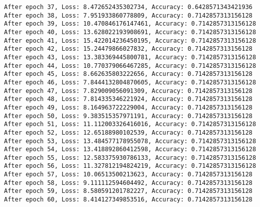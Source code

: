 \documentclass[11pt]{article}
\begin{document}
\begin{Verbatim}[commandchars=\\\{\}]
After epoch 37, Loss: 8.472652435302734, Accuracy: 0.6428571343421936
After epoch 38, Loss: 7.951933860778809, Accuracy: 0.7142857313156128
After epoch 39, Loss: 10.470846176147461, Accuracy: 0.7142857313156128
After epoch 40, Loss: 13.628022193908691, Accuracy: 0.7142857313156128
After epoch 41, Loss: 15.422014236450195, Accuracy: 0.7142857313156128
After epoch 42, Loss: 15.24479866027832, Accuracy: 0.7142857313156128
After epoch 43, Loss: 13.383369445800781, Accuracy: 0.7142857313156128
After epoch 44, Loss: 10.770379066467285, Accuracy: 0.7142857313156128
After epoch 45, Loss: 8.662635803222656, Accuracy: 0.7142857313156128
After epoch 46, Loss: 7.8444132804870605, Accuracy: 0.7142857313156128
After epoch 47, Loss: 7.829009056091309, Accuracy: 0.7142857313156128
After epoch 48, Loss: 7.814335346221924, Accuracy: 0.7142857313156128
After epoch 49, Loss: 8.164963722229004, Accuracy: 0.7142857313156128
After epoch 50, Loss: 9.383515357971191, Accuracy: 0.7142857313156128
After epoch 51, Loss: 11.112003326416016, Accuracy: 0.7142857313156128
After epoch 52, Loss: 12.65188980102539, Accuracy: 0.7142857313156128
After epoch 53, Loss: 13.484577178955078, Accuracy: 0.7142857313156128
After epoch 54, Loss: 13.418892860412598, Accuracy: 0.7142857313156128
After epoch 55, Loss: 12.583375930786133, Accuracy: 0.7142857313156128
After epoch 56, Loss: 11.327812194824219, Accuracy: 0.7142857313156128
After epoch 57, Loss: 10.06513500213623, Accuracy: 0.7142857313156128
After epoch 58, Loss: 9.111112594604492, Accuracy: 0.7142857313156128
After epoch 59, Loss: 8.580591201782227, Accuracy: 0.7142857313156128
After epoch 60, Loss: 8.414127349853516, Accuracy: 0.7142857313156128

    \end{Verbatim}
\end{document}
